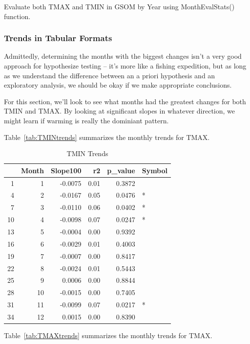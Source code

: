 \documentclass{article}\usepackage[]{graphicx}\usepackage[]{color}
\begin{document}
Evaluate both TMAX and TMIN in GSOM by Year using MonthEvalStats() function. 




\subsubsection{Trends in Tabular Formats}

Admittedly, determining the months with the biggest changes isn't a very good approach for hypothesize testing -- it's more like a fishing expedition, but as long as we understand the difference between an a priori hypothesis and an exploratory analysis, we should be okay if we make appropriate conclusions. 



For this section, we'll look to see what months had the greatest changes for both TMIN and TMAX. By looking at significant slopes in whatever direction, we might learn if warming is really the dominiant pattern. 

Table~\ref{tab:TMINtrends} summarizes the monthly trends for TMAX.

\begin{table}[ht]
\centering
\begin{tabular}{rrrrrl}
  \hline
 & Month & Slope100 & r2 & p\_value & Symbol \\ 
  \hline
1 & 1 & -0.0075 & 0.01 & 0.3872 &  \\ 
  4 & 2 & -0.0167 & 0.05 & 0.0476 & * \\ 
  7 & 3 & -0.0110 & 0.06 & 0.0402 & * \\ 
  10 & 4 & -0.0098 & 0.07 & 0.0247 & * \\ 
  13 & 5 & -0.0004 & 0.00 & 0.9392 &  \\ 
  16 & 6 & -0.0029 & 0.01 & 0.4003 &  \\ 
  19 & 7 & -0.0007 & 0.00 & 0.8417 &  \\ 
  22 & 8 & -0.0024 & 0.01 & 0.5443 &  \\ 
  25 & 9 & 0.0006 & 0.00 & 0.8844 &  \\ 
  28 & 10 & -0.0015 & 0.00 & 0.7405 &  \\ 
  31 & 11 & -0.0099 & 0.07 & 0.0217 & * \\ 
  34 & 12 & 0.0015 & 0.00 & 0.8390 &  \\ 
   \hline
\end{tabular}
\caption{TMIN Trends} 
\end{table}


Table~\ref{tab:TMAXtrends} summarizes the monthly trends for TMAX.
\end{document}
